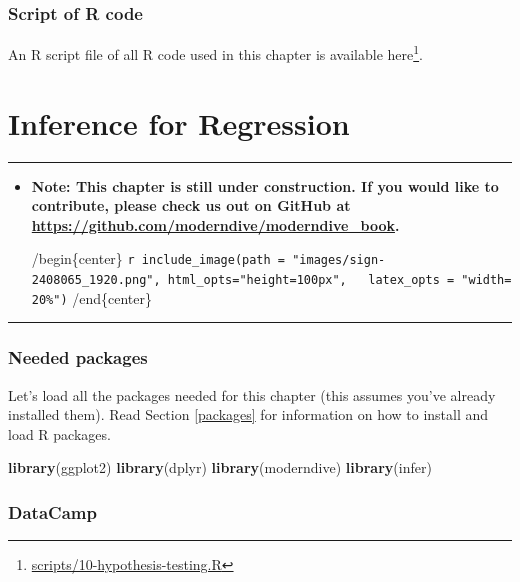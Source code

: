 \documentclass[12pt,]{krantz}
\makeatletter
\newenvironment{Shaded}{\begin{snugshade}}{\end{snugshade}}
\newcommand{\KeywordTok}[1]{\textcolor[rgb]{0.27,0.27,0.27}{\textbf{#1}}}
\newcommand{\NormalTok}[1]{#1}
\renewcommand{\href}[2]{#2\footnote{\url{#1}}}
\newenvironment{kframe}{%
\medskip{}
\setlength{\fboxsep}{.8em}
 \def\at@end@of@kframe{}%
 \ifinner\ifhmode%
  \def\at@end@of@kframe{\end{minipage}}%
  \begin{minipage}{\columnwidth}%
 \fi\fi%
 \def\FrameCommand##1{\hskip\@totalleftmargin \hskip-\fboxsep
 \colorbox{shadecolor}{##1}\hskip-\fboxsep
     \hskip-\linewidth \hskip-\@totalleftmargin \hskip\columnwidth}%
 \MakeFramed {\advance\hsize-\width
   \@totalleftmargin\z@ \linewidth\hsize
   \@setminipage}}%
 {\par\unskip\endMakeFramed%
 \at@end@of@kframe}
\renewenvironment{Shaded}{\begin{kframe}}{\end{kframe}}
\newenvironment{rmdblock}[1]
  {\begin{shaded*}
  \begin{itemize}
  \renewcommand{\labelitemi}{
    \raisebox{-.7\height}[0pt][0pt]{
    }
  }
  \item
  }
  {
  \end{itemize}
  \end{shaded*}
  }
\newenvironment{learncheck}
  {\begin{rmdblock}{warning}}
  {\end{rmdblock}}
\theoremstyle{definition}
\theoremstyle{definition}
\theoremstyle{definition}
\theoremstyle{remark}
\makeatother
\begin{document}
\subsection{Script of R code}\label{script-of-r-code-7}

An R script file of all R code used in this chapter is available
\href{scripts/10-hypothesis-testing.R}{here}.

\chapter{Inference for Regression}\label{inference-for-regression}

\begin{center}\rule{0.5\linewidth}{\linethickness}\end{center}

\begin{learncheck}
\textbf{Note: This chapter is still under construction. If you would
like to contribute, please check us out on GitHub at
\url{https://github.com/moderndive/moderndive_book}.}

/begin\{center\}
\texttt{r\ include\_image(path\ =\ "images/sign-2408065\_1920.png",\ html\_opts="height=100px",\ \ \ latex\_opts\ =\ "width=20\%")}
/end\{center\}
\end{learncheck}

\begin{center}\rule{0.5\linewidth}{\linethickness}\end{center}

\subsection*{Needed packages}\label{needed-packages-8}


Let's load all the packages needed for this chapter (this assumes you've
already installed them). Read Section \ref{packages} for information on
how to install and load R packages.

\begin{Shaded}
\begin{Highlighting}[]
\KeywordTok{library}\NormalTok{(ggplot2)}
\KeywordTok{library}\NormalTok{(dplyr)}
\KeywordTok{library}\NormalTok{(moderndive)}
\KeywordTok{library}\NormalTok{(infer)}
\end{Highlighting}
\end{Shaded}

\subsection*{DataCamp}\label{datacamp-7}
\end{document}
